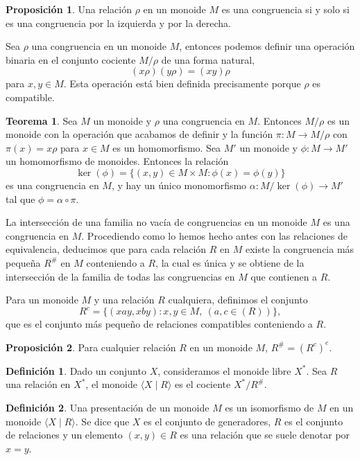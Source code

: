 \documentclass[12pt]{book}
\theoremstyle{definition}
\newtheorem{defi}{Definición}[section]
\newtheorem{teor}{Teorema}[section]
\newtheorem{prop}{Proposición}[section]
\begin{document}
\begin{prop}
Una relación $\rho$ en un monoide $M$ es una congruencia si y solo si es una congruencia por la izquierda y por la derecha.
\end{prop}

Sea $\rho$ una congruencia en un monoide $M$, entonces podemos definir una operación binaria en el conjunto cociente $M/\rho$ de una forma natural,
$$(x\rho)(y\rho)=(xy)\rho$$
para $x,y\in M$. Esta operación está bien definida precisamente porque $\rho$ es compatible.

\begin{teor}
Sea $M$ un monoide y $\rho$ una congruencia en $M$. Entonces $M/\rho$ es un monoide con la operación que acabamos de definir y la función $\pi:M\rightarrow M/\rho$ con $\pi(x)=x\rho$ para $x\in M$ es un homomorfismo.
Sea $M'$ un monoide y $\phi:M\rightarrow M'$ un homomorfismo de monoides. Entonces la relación
$$\ker(\phi)=\{(x,y)\in M\times M: \phi(x)=\phi(y)\}$$
es una congruencia en $M$, y hay un único monomorfismo $\alpha:M/\ker(\phi)\rightarrow M'$ tal que $\phi=\alpha\circ\pi$.
\end{teor}

La intersección de una familia no vacía de congruencias en un monoide $M$ es una congruencia en $M$. Procediendo como lo hemos hecho antes con las relaciones de equivalencia, deducimos que para cada relación $R$ en $M$ existe la congruencia más pequeña $R^\#$ en $M$ conteniendo a $R$, la cual es única y se obtiene de la intersección de la familia de todas las congruencias en $M$ que contienen a $R$.

Para un monoide $M$ y una relación $R$ cualquiera, definimos el conjunto
$$R^c=\{(xay,xby):x,y\in M,\ (a,c\in(R))\},$$
que es el conjunto más pequeño de relaciones compatibles conteniendo a $R$.

\begin{prop}
Para cualquier relación $R$ en un monoide $M$, $R^\#=(R^c)^e$.
\end{prop}

\begin{defi}
Dado un conjunto $X$, consideramos el monoide libre $X^*$. Sea $R$ una relación en $X^*$, el monoide $\langle X\mid R\rangle$ es el cociente $X^*/R^\#$.
\end{defi}

\begin{defi}
Una presentación de un monoide $M$ es un isomorfismo de $M$ en un monoide $\langle X\mid R\rangle$. Se dice que $X$ es el conjunto de generadores, $R$ es el conjunto de relaciones y un elemento $(x,y)\in R$ es una relación que se suele denotar por $x=y$.
\end{defi}
\end{document}
